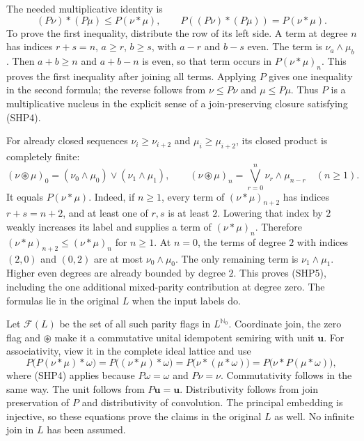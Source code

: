 The needed multiplicative identity is
\begin{equation}\tag{SHP4}
 (P\nu)*(P\mu)\le P(\nu*\mu),\qquad
 P((P\nu)*(P\mu))=P(\nu*\mu).
\end{equation}
To prove the first inequality, distribute the row of its left
side. A term at degree $n$ has indices
$r+s=n$, $a\ge r$, $b\ge s$, with $a-r$ and $b-s$ even.
The term is $\nu_a\wedge\mu_b$.
Then $a+b\ge n$ and $a+b-n$ is even, so that term occurs
in $P(\nu*\mu)_n$. This proves the first inequality after
joining all terms. Applying $P$ gives one inequality in the
second formula; the reverse follows from
$\nu\le P\nu$ and $\mu\le P\mu$.
Thus $P$ is a multiplicative nucleus in the explicit sense
of a join-preserving closure satisfying (SHP4).

For already closed sequences $\nu_i\ge\nu_{i+2}$ and
$\mu_i\ge\mu_{i+2}$, its closed product is completely finite:
\begin{equation}\tag{SHP5}
 (\nu\mathbin{\circledast}\mu)_0
       =(\nu_0\wedge\mu_0)\vee(\nu_1\wedge\mu_1),\qquad
 (\nu\mathbin{\circledast}\mu)_n
       =\bigvee_{r=0}^{n}\nu_r\wedge\mu_{n-r}
                         \quad(n\ge1).
\end{equation}
It equals $P(\nu*\mu)$. Indeed, if $n\ge1$, every term of
$(\nu*\mu)_{n+2}$ has indices $r+s=n+2$, and at least one
of $r,s$ is at least $2$. Lowering that index by $2$
weakly increases its label and supplies a term of
$(\nu*\mu)_n$. Therefore $(\nu*\mu)_{n+2}\le(\nu*\mu)_n$
for $n\ge1$. At $n=0$, the terms of degree $2$ with indices
$(2,0)$ and $(0,2)$ are at most $\nu_0\wedge\mu_0$.
The only remaining term is $\nu_1\wedge\mu_1$.
Higher even degrees are already bounded by degree $2$.
This proves (SHP5), including the one additional mixed-parity
contribution at degree zero. The formulas lie in the
original $L$ when the input labels do.

Let $\mathcal F(L)$ be the set of all such parity flags in
$L^{\mathbb N_0}$. Coordinate join, the zero flag and
$\circledast$ make it a commutative unital idempotent
semiring with unit $\mathbf u$.
For associativity, view it in the complete ideal lattice and use
\[
 P\bigl(P(\nu*\mu)*\omega\bigr)
 =P\bigl((\nu*\mu)*\omega\bigr)
 =P\bigl(\nu*(\mu*\omega)\bigr)
 =P\bigl(\nu*P(\mu*\omega)\bigr),
\]
where (SHP4) applies because $P\omega=\omega$ and $P\nu=\nu$.
Commutativity follows in the same way.
The unit follows from $P\mathbf u=\mathbf u$.
Distributivity follows from join preservation of $P$ and
distributivity of convolution. The principal embedding is
injective, so these equations prove the claims in the
original $L$ as well. No infinite join in $L$ has been assumed.

